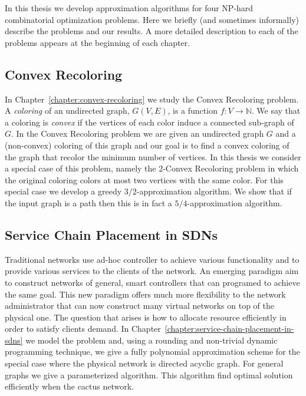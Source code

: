 In this thesis we develop approximation algorithms for four NP-hard combinatorial optimization problems.
Here we briefly (and sometimes informally) describe the problems and our results.
A more detailed description to each of the problems appears at the beginning of each chapter.

\subsection*{Convex Recoloring} 
In Chapter~\ref{chapter:convex-recoloring} we study the Convex Recoloring problem.
A \emph{coloring} of an undirected graph, $G(V, E)$, is a function $f:V \to \mathbb{N}$.
We say that a coloring is \emph{convex} if the vertices of each color induce a connected sub-graph of $G$.
In the Convex Recoloring problem we are given an undirected graph $G$ and a (non-convex) coloring of this graph and our goal is to find a convex coloring of the graph that recolor the minimum number of vertices.
In this thesis we consider a special case of this problem, namely the 2-Convex Recoloring problem in which the original coloring colors at most two vertices with the same color.
For this special case we develop a greedy $3/2$-approximation algorithm.
We show that if the input graph is a path then this is in fact a $5/4$-approximation algorithm.


\subsection*{Service Chain Placement in SDNs} 
Traditional networks use ad-hoc controller to achieve various functionality and to provide various services to the clients of the network.
An emerging paradigm aim to construct networks of general, smart controllers that can programed to achieve the same goal. 
This new paradigm offers much more flexibility to the network administrator that can now construct many virtual networks on top of the physical one.
The question that arises is how to allocate resource efficiently in order to satisfy clients demand.
In Chapter~\ref{chapter:service-chain-placement-in-sdns} we model the problem and, using a rounding and non-trivial dynamic programming technique, we give a fully polynomial approximation scheme for the special case where the physical network is directed acyclic graph. 
For general graphs we give a parameterized algorithm.
This algorithm find optimal solution efficiently when the cactus network.


